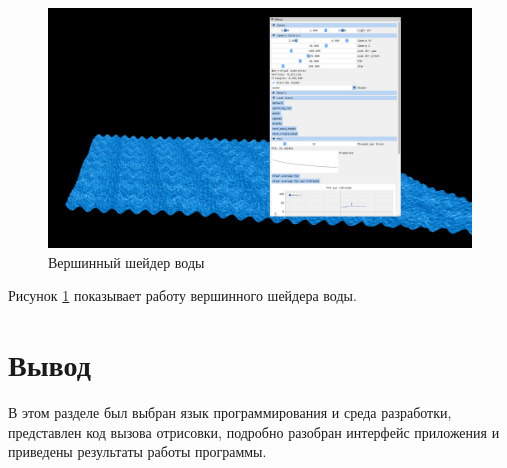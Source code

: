 \begin{figure}[H]
	\begin{center}
		\includegraphics[scale=0.30]{img/i3.png}
	\end{center}
	\captionsetup{justification=centering}
	\caption{Вершинный шейдер воды}
	\label{img:water}
\end{figure}

Рисунок \ref{img:water} показывает работу вершинного шейдера воды.

\section*{Вывод}
В этом разделе был выбран язык программирования и среда разработки, представлен код вызова отрисовки, подробно разобран интерфейс приложения и приведены результаты работы программы.